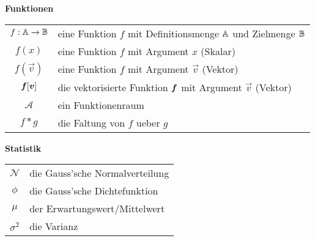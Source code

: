 \begin{center}\textbf{Funktionen}\end{center}
\begin{tabular}{cl}
  $f: \mathbb{A} \to \mathbb{B}$ & eine Funktion $f$ mit Definitionsmenge $\mathbb{A}$ und Zielmenge $\mathbb{B}$ \\
  $f(x)$ & eine Funktion $f$ mit Argument $x$ (Skalar) \\
  $f(\vec{v})$ & eine Funktion $f$ mit Argument $\vec{v}$ (Vektor) \\
  $\bm{f}[\bm{v}]$ & die vektorisierte Funktion $\bm{f}$ mit Argument $\vec{v}$ (Vektor) \\
  $\mathcal{A}$ & ein Funktionenraum \\
  $f * g$ & die Faltung von $f$ ueber $g$ \\

\end{tabular}

\begin{center}\textbf{Statistik}\end{center}
\begin{tabular}{cl}
  $\mathcal{N}$ & die Gauss'sche Normalverteilung \\
  $\phi$ & die Gauss'sche Dichtefunktion \\
  $\mu$ & der Erwartungswert/Mittelwert \\
  $\sigma^2$ & die Varianz
\end{tabular}

